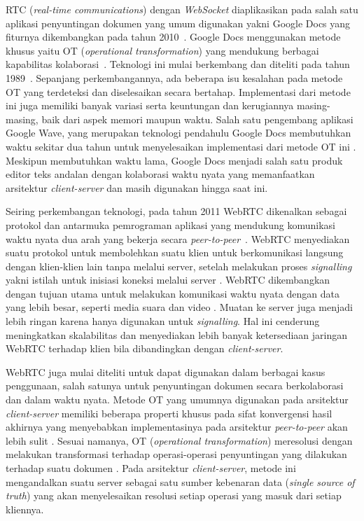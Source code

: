 RTC (\textit{real-time communications}) dengan \textit{WebSocket} diaplikasikan pada salah satu aplikasi penyuntingan dokumen yang umum digunakan yakni Google Docs yang fiturnya dikembangkan pada tahun 2010~\citep{googledocs1}. Google Docs menggunakan metode khusus yaitu OT (\textit{operational transformation}) yang mendukung berbagai kapabilitas kolaborasi~\citep{googledocs2,googledocs3}. Teknologi ini mulai berkembang dan diteliti pada tahun 1989~\citep{Ellis1989}. Sepanjang perkembangannya, ada beberapa isu kesalahan pada metode OT yang terdeteksi dan diselesaikan secara bertahap. Implementasi dari metode ini juga memiliki banyak variasi serta keuntungan dan kerugiannya masing-masing, baik dari aspek memori maupun waktu. Salah satu pengembang aplikasi Google Wave, yang merupakan teknologi pendahulu Google Docs membutuhkan waktu sekitar dua tahun untuk menyelesaikan implementasi dari metode OT ini \citep{shareJS}. Meskipun membutuhkan waktu lama, Google Docs menjadi salah satu produk editor teks andalan dengan kolaborasi waktu nyata yang memanfaatkan arsitektur \textit{client-server} dan masih digunakan hingga saat ini.

Seiring perkembangan teknologi, pada tahun 2011 WebRTC dikenalkan sebagai protokol dan antarmuka pemrograman aplikasi yang mendukung komunikasi waktu nyata dua arah yang bekerja secara \textit{peer-to-peer}~\citep{dutton2012getting}. WebRTC menyediakan suatu protokol untuk membolehkan suatu klien untuk berkomunikasi langsung dengan klien-klien lain tanpa melalui server, setelah melakukan proses \textit{signalling} yakni istilah untuk inisiasi koneksi melalui server \citep{sredojev2015webrtc}. WebRTC dikembangkan dengan tujuan utama untuk melakukan komunikasi waktu nyata dengan data yang lebih besar, seperti media suara dan video \citep{dutton2012getting}. Muatan ke server juga menjadi lebih ringan karena hanya digunakan untuk \textit{signalling}. Hal ini cenderung meningkatkan skalabilitas dan menyediakan lebih banyak ketersediaan jaringan WebRTC terhadap klien bila dibandingkan dengan \textit{client-server}.

WebRTC juga mulai diteliti untuk dapat digunakan dalam berbagai kasus penggunaan, salah satunya untuk penyuntingan dokumen secara berkolaborasi dan dalam waktu nyata. Metode OT yang umumnya digunakan pada arsitektur \textit{client-server} memiliki beberapa properti khusus pada sifat konvergensi hasil akhirnya yang menyebabkan implementasinya pada arsitektur \textit{peer-to-peer} akan lebih sulit \citep{Sun2017}. Sesuai namanya, OT (\textit{operational transformation}) meresolusi dengan melakukan transformasi terhadap operasi-operasi penyuntingan yang dilakukan terhadap suatu dokumen \citep{OTOverview1}. Pada arsitektur \textit{client-server}, metode ini mengandalkan suatu server sebagai satu sumber kebenaran data (\textit{single source of truth}) yang akan menyelesaikan resolusi setiap operasi yang masuk dari setiap kliennya.

